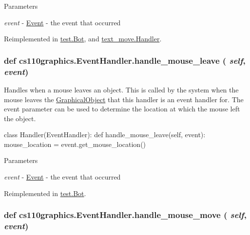 \begin{DoxyParams}{Parameters}
\item[{\em event}]-\/ \hyperlink{classcs110graphics_1_1Event}{Event} -\/ the event that occurred \end{DoxyParams}


Reimplemented in \hyperlink{classtest_1_1Bot_a0b184ab86d0dd6121e55394a24c8751e}{test.Bot}, and \hyperlink{classtext__move_1_1Handler_a51652a1d51554e661117de1ee7856169}{text\_\-move.Handler}.\hypertarget{classcs110graphics_1_1EventHandler_a5deaf2b6b8055e97ac0ddf6603132c64}{
\subsubsection[{handle\_\-mouse\_\-leave}]{\setlength{\rightskip}{0pt plus 5cm}def cs110graphics.EventHandler.handle\_\-mouse\_\-leave ( {\em self}, \/   {\em event})}}
\label{classcs110graphics_1_1EventHandler_a5deaf2b6b8055e97ac0ddf6603132c64}


Handles when a mouse leaves an object. This is called by the system when the mouse leaves the \hyperlink{classcs110graphics_1_1GraphicalObject}{GraphicalObject} that this handler is an event handler for. The event parameter can be used to determine the location at which the mouse left the object. 
\begin{DoxyCode}
 class Handler(EventHandler):
     def handle_mouse_leave(self, event):
         mouse_location = event.get_mouse_location()
\end{DoxyCode}
 
\begin{DoxyParams}{Parameters}
\item[{\em event}]-\/ \hyperlink{classcs110graphics_1_1Event}{Event} -\/ the event that occurred \end{DoxyParams}


Reimplemented in \hyperlink{classtest_1_1Bot_a2b65e6ecaba1afb4f117b74a684b4387}{test.Bot}.\hypertarget{classcs110graphics_1_1EventHandler_a521fdcd170d15c0b8baa124c78b6d1ef}{
\subsubsection[{handle\_\-mouse\_\-move}]{\setlength{\rightskip}{0pt plus 5cm}def cs110graphics.EventHandler.handle\_\-mouse\_\-move ( {\em self}, \/   {\em event})}}
\label{classcs110graphics_1_1EventHandler_a521fdcd170d15c0b8baa124c78b6d1ef}


